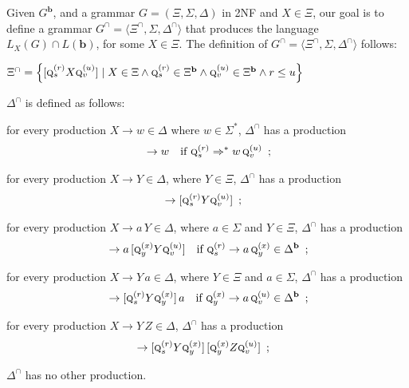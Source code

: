 \documentclass[final]{llncs}
\def\set#1{{\left\{ #1 \right\}}}
\def\tuple#1{{\langle #1 \rangle}}
\def\prod{\Delta}
\def\pat{{\mathbf{b}}}
\def\Vars{\ensuremath{\Xi}}
\begin{document}
Given $G^{\pat}$, and a grammar $G=(\Vars,\Sigma,\prod)$ in 2NF and \(X\in\Vars\), our goal is to define a
grammar \(G^{\cap} = \tuple {\Vars^{\cap},\Sigma,\prod^{\cap}}\) that
produces the language $L_X(G) \cap L(\pat)$, for some $X \in
\Vars$. The definition of $G^\cap = \tuple {\Vars^{\cap}, \Sigma,
  \prod^{\cap}}$ follows:
\begin{compactitem}
\item $\Vars^{\cap}=\set{ [\textsc{q}^{(r)}_{s} X \textsc{q}^{(u)}_{v}]
  \mid X \in \Vars \land \textsc{q}^{(r)}_{s}\in\Vars^{\pat}\land
  \textsc{q}^{(u)}_{v} \in\Vars^{\pat}\land r\leq u}$
\item $\prod^{\cap}$ is defined as follows: 
  \begin{compactitem}
  \item for every production $X\rightarrow w\in\prod$ where
    \(w\in\Sigma^*\), \(\prod^{\cap}\) has a production
    \begin{align}
      [\textsc{q}^{(r)}_{s} X \textsc{q}^{(u)}_{v}]&\rightarrow w & \text{if } \textsc{q}^{(r)}_{s}\Rightarrow^* w \, \textsc{q}^{(u)}_{v}\enspace ;\label{eq:terminalsonly}
    \end{align}
  \item for every production $X\rightarrow Y\in\prod$, where $Y \in \Vars$, \(\prod^{\cap}\) has a production
    \begin{align}
      [\textsc{q}^{(r)}_{s} X \textsc{q}^{(u)}_v]&\rightarrow[\textsc{q}^{(r)}_{s} Y \textsc{q}^{(u)}_{v}] \enspace ;\label{eq:1var}
    \end{align}
  \item for every production $X\rightarrow a\, Y\in\prod$, where $a \in \Sigma$ and $Y \in \Vars$, \(\prod^{\cap}\) has a production
    \begin{align}
      [\textsc{q}^{(r)}_{s} X \textsc{q}^{(u)}_v]&\rightarrow a \, [\textsc{q}^{(x)}_{y} Y \textsc{q}^{(u)}_v] & \text{if } \textsc{q}^{(r)}_{s}\rightarrow a\,\textsc{q}^{(x)}_{y} \in \prod^{\pat}\enspace ;\label{eq:gammavar} 
    \end{align}
  \item for every production $X\rightarrow Y\, a\in\prod$, where $Y \in \Vars$ and $a \in \Sigma$, \(\prod^{\cap}\) has a production
    \begin{align}
      [\textsc{q}^{(r)}_{s} X \textsc{q}^{(u)}_v]&\rightarrow [\textsc{q}^{(r)}_{s} Y \textsc{q}^{(x)}_{y}] \, a & \text{if } \textsc{q}^{(x)}_{y}\rightarrow a\,\textsc{q}^{(u)}_{v} \in \prod^{\pat}\enspace ;\label{eq:vargamma}
    \end{align}
  \item for every production $X\rightarrow Y\, Z\in\prod$, \(\prod^{\cap}\) has a production
    \begin{align}
			[\textsc{q}^{(r)}_{s} X \textsc{q}^{(u)}_{v}] &\rightarrow [\textsc{q}^{(r)}_{s} Y \textsc{q}^{(x)}_y]\,[\textsc{q}^{(x)}_y Z \textsc{q}^{(u)}_v] \enspace ;\label{eq:2var}
    \end{align}
  \item \(\prod^{\cap}\) has no other production.
  \end{compactitem}
\end{compactitem}
\end{document}
